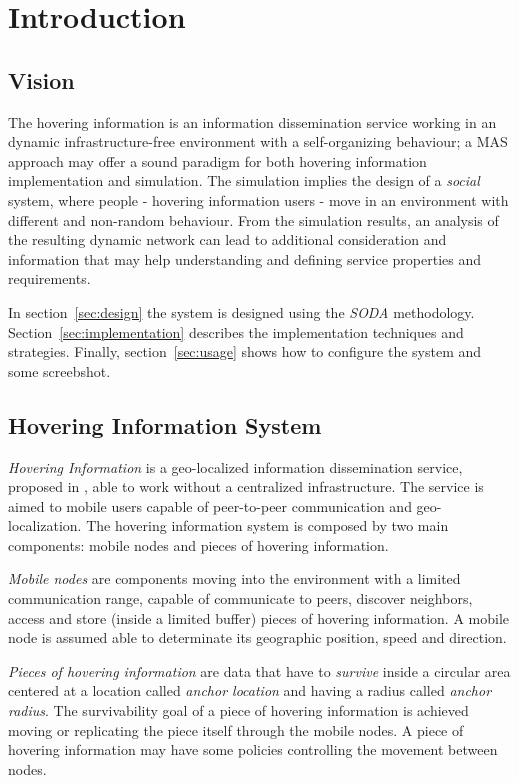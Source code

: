\section{Introduction}

\subsection{Vision}

The hovering information is an information dissemination service working in an
dynamic infrastructure-free environment with a self-organizing behaviour; a MAS\cite{OEOP,epmas}
approach may offer a sound paradigm for both hovering information
implementation and simulation. The simulation implies the design of a
\emph{social} system, where people - hovering information users - move in an
environment with different and non-random behaviour. From the simulation
results, an analysis of the resulting dynamic network can lead to additional
consideration and information that may help understanding and defining service
properties and requirements.

In section~\ref{sec:design} the system is designed using the \emph{SODA}\cite{soda}
methodology. Section~\ref{sec:implementation} describes the implementation
techniques and strategies. Finally, section~\ref{sec:usage} shows how to
configure the system and some screebshot.

\subsection{Hovering Information System}

\emph{Hovering Information} is a geo-localized information dissemination
service, proposed in \cite{hover}, able to work without a centralized
infrastructure. The service is aimed to mobile users capable of peer-to-peer
communication and geo-localization. The hovering information system is composed
by two main components: mobile nodes and pieces of hovering information.

\emph{Mobile nodes} are components moving into the environment with a limited
communication range, capable of communicate to peers, discover neighbors,
access and store (inside a limited buffer) pieces of hovering information. A
mobile node is assumed able to determinate its geographic position, speed and
direction.

\emph{Pieces of hovering information} are data that have to \emph{survive}
inside a circular area centered at a location called \emph{anchor location} and
having a radius called \emph{anchor radius}. The survivability goal of a piece
of hovering information is achieved moving or replicating the piece itself
through the mobile nodes. A piece of hovering information may have some
policies controlling the movement between nodes.

